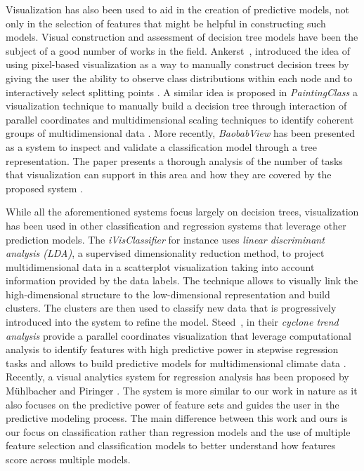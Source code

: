Visualization has also been used to aid in the creation of predictive models, not only in the selection of features that might be helpful in constructing such models. Visual construction and assessment of decision tree models have been the subject of a good number of works in the field. Ankerst~\etal, introduced the idea of using pixel-based visualization as a way to manually construct decision trees by giving the user the ability to observe class distributions within each node and to interactively select splitting points \cite{ankerst1999visual, ankerst2000towards}. A similar idea is proposed in \textit{PaintingClass} a visualization technique to manually build a decision tree through interaction of parallel coordinates and multidimensional scaling techniques to identify coherent groups of multidimensional data \cite{Teoh:2003:PIC:956750.956837}. More recently, \textit{BaobabView} has been presented as a system to inspect and validate a classification model through a tree representation. The paper presents a thorough analysis of the number of tasks that visualization can support in this area and how they are covered by the proposed system \cite{van2011baobabview}.

While all the aforementioned systems focus largely on decision trees, visualization has been used in other classification and regression systems that leverage other prediction models. The \textit{iVisClassifier} \cite{choo2010ivisclassifier} for instance uses \textit{linear discriminant analysis (LDA)}, a supervised dimensionality reduction method, to project multidimensional data in a scatterplot visualization taking into account information provided by the data labels. The technique allows to visually link the high-dimensional structure to the low-dimensional representation and build clusters. The clusters are then used to classify new data that is progressively introduced into the system to refine the model. Steed~\etal, in their \textit{cyclone trend analysis} provide a parallel coordinates visualization that leverage computational analysis to identify features with high predictive power in stepwise regression tasks and allows to build predictive models for multidimensional climate data \cite{steed2009guided, steed2009tropical}. Recently, a visual analytics system for regression analysis has been proposed by M\"uhlbacher and Piringer \cite{muhlbacher2013partition}. The system is more similar to our work in nature as it also focuses on the predictive power of feature sets and guides the user in the predictive modeling process. The main difference between this work and ours is our focus on classification rather than regression models and the use of multiple feature selection and classification models to better understand how features score across multiple models.

